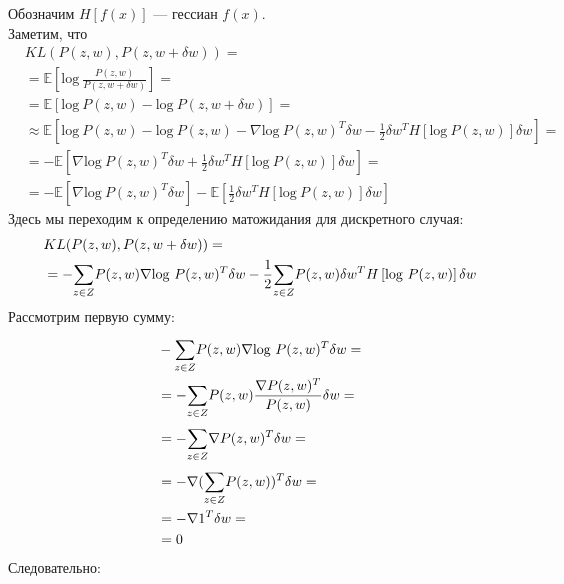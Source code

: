 \documentclass[a4paper,12pt]{article}
\begin{document}
Обозначим $H\left[f(x)\right]$ --- гессиан $f(x)$. \\
Заметим, что
$$
\begin{aligned}
    & KL(P(z, w), P(z, w + \delta w)) = \\
    & = \mathbb{E} \left[ \mbox{log} ~ \frac{P(z, w)}{P(z, w + \delta w)} \right] = \\
    & = \mathbb{E} \left[ \mbox{log} ~ P(z, w) - \mbox{log} ~ P(z, w + \delta w) \right] = \\
    & \approx \mathbb{E} \left[ \mbox{log} ~ P(z, w) - \mbox{log} ~ P(z, w) - \nabla \mbox{log} ~ P(z, w)^T \delta w - \frac{1}{2} \delta w^T H\left[\mbox{log} ~ P(z, w)\right] \delta w \right] = \\
    & = \mathbb{-E} \left[ \nabla \mbox{log} ~ P(z, w)^T \delta w + \frac{1}{2} \delta w^T H\left[\mbox{log} ~ P(z, w)\right] \delta w \right] = \\
    & = \mathbb{-E} \left[ \nabla \mbox{log} ~ P(z, w)^T \delta w \right] - \mathbb{E} \left[ \frac{1}{2} \delta w^T H\left[\mbox{log} ~ P(z, w)\right] \delta w \right]
\end{aligned}
$$
Здесь мы переходим к определению матожидания для дискретного случая:
$$
\begin{aligned}
    & KL(P(z, w), P(z, w + \delta w)) = \\
    & = -\overset{}{\underset{z \in Z}{\sum}}{P}(z, w) \nabla \mbox{log} ~ P(z, w)^T \delta w -\frac{1}{2} \overset{}{\underset{z \in Z}{\sum}}{P}(z, w) \delta w^T H\left[\mbox{log} ~ P(z, w) \right] \delta w \\
\end{aligned}
$$
Рассмотрим первую сумму:
$$
\begin{aligned}
    & -\overset{}{\underset{z \in Z}{\sum}}{P}(z, w) \nabla \mbox{log} ~ P(z, w)^T \delta w = \\
    & = -\overset{}{\underset{z \in Z}{\sum}}{P}(z, w) \frac{\nabla P(z, w)^T}{P(z, w)} \delta w = \\
    & = -\overset{}{\underset{z \in Z}{\sum}}{\nabla} P(z, w)^T \delta w = \\
    & = -\nabla (\overset{}{\underset{z \in Z}{\sum}}{P}(z, w))^T \delta w = \\
    & = -\nabla 1^T \delta w = \\
    & = 0
\end{aligned}
$$
Следовательно: 
\end{document}
